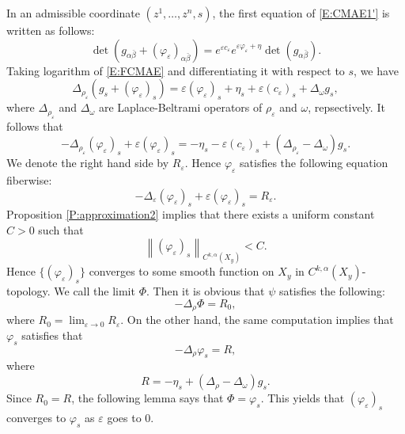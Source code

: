 \documentclass{amsart}
\theoremstyle{definition}
\numberwithin{equation}{section}
\begin{document}
In an admissible coordinate $(z^1,\dots,z^n,s)$, the first equation of \eqref{E:CMAE1'} is written as follows:
\begin{equation} \label{E:FCMAE}
\det(g_{\alpha\bar\beta}+(\varphi_{\varepsilon})_{\alpha\bar\beta})
=
e^{\varepsilon c_\varepsilon}e^{\varepsilon\varphi_{\varepsilon}+\eta}
\det(g_{\alpha\bar\beta}).
\end{equation}
Taking logarithm of \eqref{E:FCMAE} and differentiating it with respect to $s$, we have
\begin{equation*}
\Delta_{\rho_{\varepsilon}}{\left({g_s+({\varphi}_{\varepsilon})_s}\right)}
=
\varepsilon({\varphi}_{\varepsilon})_s
+
\eta_s+{\varepsilon}(c_{\varepsilon})_s
+
\Delta_\omega g_s,
\end{equation*}
where $\Delta_{\rho_{\varepsilon}}$ and $\Delta_\omega$ are Laplace-Beltrami operators of $\rho_{\varepsilon}$ and $\omega$, repsectively. It follows that
\begin{equation} \label{E:pde1}
-\Delta_{\rho_{\varepsilon}}({\varphi}_{\varepsilon})_s
+
\varepsilon({\varphi}_{\varepsilon})_s
=
-\eta_s-{\varepsilon}(c_{\varepsilon})_s
+
(\Delta_{\rho_{\varepsilon}}-\Delta_\omega){g}_s.
\end{equation}
We denote the right hand side by $R_{\varepsilon}$. Hence ${\varphi}_{\varepsilon}$ satisfies the following equation fiberwise:
\begin{equation} \label{E:pde1'}
-\Delta_{\varepsilon}({\varphi}_{\varepsilon})_s
+
\varepsilon({\varphi}_{\varepsilon})_s
=
R_{\varepsilon}.
\end{equation}
Proposition \ref{P:approximation2} implies that there exists a uniform constant $C>0$ such that 
\begin{equation*}
{\left\|{({\varphi}_{\varepsilon})_s}\right\|}_{C^{k,\alpha}(X_y)}<C.
\end{equation*}
Hence $\{({\varphi}_{\varepsilon})_s\}$ converges to some smooth function on $X_y$ in $C^{k,\alpha}(X_y)$-topology. We call the limit $\Phi$. Then it is obvious that $\psi$ satisfies the following:
\begin{equation*}
-\Delta_\rho \Phi
=
R_0,
\end{equation*}
where $R_0=\lim_{{\varepsilon}\rightarrow0}R_{\varepsilon}$. On the other hand, the same computation implies that ${\varphi}_s$ satisfies that
\begin{equation*}
-\Delta_\rho{\varphi}_s
=
R,
\end{equation*}
where 
$$
R=-\eta_s+(\Delta_\rho-\Delta_\omega)g_s.
$$
Since $R_0=R$, the following lemma says that $\Phi={\varphi}_s$. This yields that $({\varphi}_{\varepsilon})_s$ converges to ${\varphi}_s$ as ${\varepsilon}$ goes to $0$.
\end{document}
